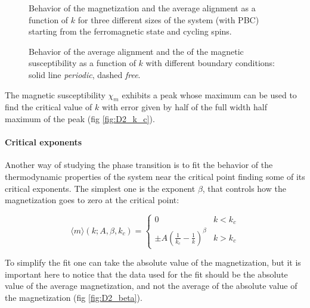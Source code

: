 \documentclass[a4paper, 11pt]{article}
\begin{document}
      \begin{figure}[H]
        \centering
        \caption{Behavior of the magnetization and the average alignment as a function of $k$ for three different sizes of the system (with PBC) starting from the ferromagnetic state and cycling spins.}
        \label{fig:D2_size_dependent}
      \end{figure}

      \begin{figure}
        \centering
        \caption{Behavior of the average alignment and the of the magnetic susceptibility as a function of $k$ with different boundary conditions: solid line \emph{periodic}, dashed \emph{free}.}
        \label{fig:D2_achi}
      \end{figure}

      The magnetic susceptibility $\chi_m$ exhibits a peak whose maximum can be used to find the critical value of $k$ with error given by half of the full width half maximum of the peak (fig \ref{fig:D2_k_c}).

      \paragraph{Critical exponents}
      Another way of studying the phase transition is to fit the behavior of the thermodynamic properties of the system near the critical point finding some of its critical exponents.
      The simplest one is the exponent $\beta$, that controls how the magnetization goes to zero at the critical point:

      \begin{equation*}
        \langle m \rangle (k;A,\beta,k_c) = \begin{cases}
          0 & k < k_c \\
          \pm A \left(\frac{1}{k_c} - \frac{1}{k} \right)^\beta & k > k_c
        \end{cases}
      \end{equation*}

      To simplify the fit one can take the absolute value of the magnetization, but it is important here to notice that the data used for the fit should be the absolute value of the average magnetization, and not the average of the absolute value of the magnetization (fig \ref{fig:D2_beta}).
\end{document}
